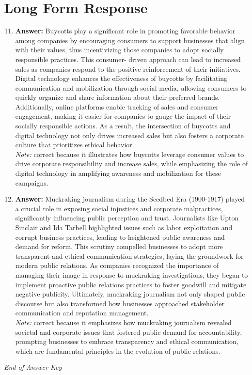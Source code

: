 \documentclass[12pt]{article}
\begin{document}
\section*{Long Form Response}
\begin{enumerate}[label=\arabic*.]
\setcounter{enumi}{10}
\item \textbf{Answer:} Buycotts play a significant role in promoting favorable behavior among companies by encouraging consumers to support businesses that align with their values, thus incentivizing those companies to adopt socially responsible practices. This consumer- driven approach can lead to increased sales as companies respond to the positive reinforcement of their initiatives. Digital technology enhances the effectiveness of buycotts by facilitating communication and mobilization through social media, allowing consumers to quickly organize and share information about their preferred brands. Additionally, online platforms enable tracking of sales and consumer engagement, making it easier for companies to gauge the impact of their socially responsible actions. As a result, the intersection of buycotts and digital technology not only drives increased sales but also fosters a corporate culture that prioritizes ethical behavior.
\\ \textit{Note:} correct because it illustrates how buycotts leverage consumer values to drive corporate responsibility and increase sales, while emphasizing the role of digital technology in amplifying awareness and mobilization for these campaigns.
\item \textbf{Answer:} Muckraking journalism during the Seedbed Era (1900-1917) played a crucial role in exposing social injustices and corporate malpractices, significantly influencing public perception and trust. Journalists like Upton Sinclair and Ida Tarbell highlighted issues such as labor exploitation and corrupt business practices, leading to heightened public awareness and demand for reform. This scrutiny compelled businesses to adopt more transparent and ethical communication strategies, laying the groundwork for modern public relations. As companies recognized the importance of managing their image in response to muckraking investigations, they began to implement proactive public relations practices to foster goodwill and mitigate negative publicity. Ultimately, muckraking journalism not only shaped public discourse but also transformed how businesses approached stakeholder communication and reputation management.
\\ \textit{Note:} correct because it emphasizes how muckraking journalism revealed societal and corporate issues that fostered public demand for accountability, prompting businesses to embrace transparency and ethical communication, which are fundamental principles in the evolution of public relations.
\end{enumerate}

\vfill
\noindent\textit{End of Answer Key}
\end{document}
